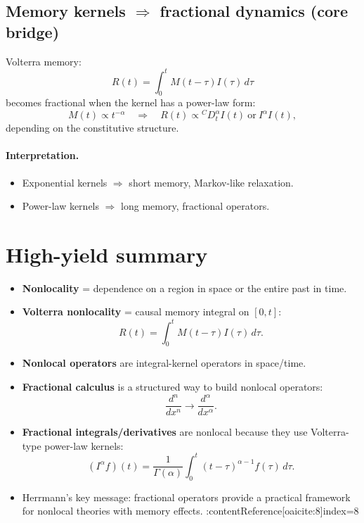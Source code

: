 \subsection{Memory kernels $\Rightarrow$ fractional dynamics (core bridge)}
Volterra memory:
\[
R(t)=\int_0^t M(t-\tau)I(\tau)\,d\tau
\]
becomes fractional when the kernel has a power-law form:
\begin{equation}
M(t)\propto t^{-\alpha}
\quad\Rightarrow\quad
R(t)\propto {}^{C}D_t^\alpha I(t)\ \text{or}\ I^\alpha I(t),
\end{equation}
depending on the constitutive structure.

\paragraph{Interpretation.}
\begin{itemize}
\item Exponential kernels $\Rightarrow$ short memory, Markov-like relaxation.
\item Power-law kernels $\Rightarrow$ long memory, fractional operators.
\end{itemize}


\section{High-yield summary}

\begin{itemize}
\item \textbf{Nonlocality} = dependence on a region in space or the entire past in time.
\item \textbf{Volterra nonlocality} = causal memory integral on $[0,t]$:
\[
R(t)=\int_0^t M(t-\tau)I(\tau)\,d\tau.
\]
\item \textbf{Nonlocal operators} are integral-kernel operators in space/time.
\item \textbf{Fractional calculus} is a structured way to build nonlocal operators:
\[
\frac{d^n}{dx^n}\to \frac{d^\alpha}{dx^\alpha}.
\]
\item \textbf{Fractional integrals/derivatives} are nonlocal because they use Volterra-type
power-law kernels:
\[
(I^\alpha f)(t)=\frac{1}{\Gamma(\alpha)}\int_0^t (t-\tau)^{\alpha-1}f(\tau)\,d\tau.
\]
\item Herrmann's key message: fractional operators provide a practical framework for
nonlocal theories with memory effects. :contentReference[oaicite:8]{index=8}
\end{itemize}
